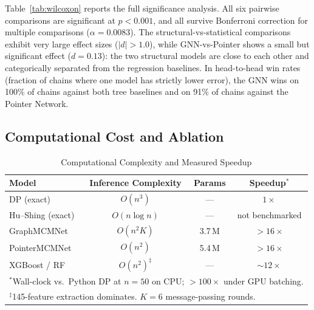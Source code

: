 \documentclass[conference]{IEEEtran}
\begin{document}
Table~\ref{tab:wilcoxon} reports the full significance analysis. All six
pairwise comparisons are significant at $p < 0.001$, and all survive
Bonferroni correction for multiple comparisons
($\alpha = 0.0083$). The structural-vs-statistical comparisons exhibit very
large effect sizes ($|d| > 1.0$), while GNN-vs-Pointer shows a small but
significant effect ($d = 0.13$): the two structural models are close to each
other and categorically separated from the regression baselines. In
head-to-head win rates (fraction of chains where one model has strictly lower
error), the GNN wins on 100\% of chains against both tree baselines and on
91\% of chains against the Pointer Network.

\subsection{Computational Cost and Ablation}
\label{sec:latency}

\begin{table}[t]
\caption{Computational Complexity and Measured Speedup}
\label{tab:complexity}
\centering
\begin{tabular}{lccc}
\toprule
Model & Inference Complexity & Params & Speedup$^{\ast}$ \\
\midrule
DP (exact)      & $O(n^3)$   & ---   & $1\times$ \\
Hu--Shing (exact) & $O(n \log n)$ & --- & not benchmarked \\
GraphMCMNet     & $O(n^2 K)$ & 3.7\,M & ${>}16\times$ \\
PointerMCMNet   & $O(n^2)$   & 5.4\,M & ${>}16\times$ \\
XGBoost / RF    & $O(n^2)^{\ddagger}$ & --- & ${\sim}12\times$ \\
\bottomrule
\multicolumn{4}{l}{\footnotesize $^{\ast}$Wall-clock vs.\ Python DP at $n{=}50$ on CPU; ${>}100\times$ under GPU batching.} \\
\multicolumn{4}{l}{\footnotesize $^{\ddagger}$145-feature extraction dominates. $K{=}6$ message-passing rounds.}
\end{tabular}
\end{table}
\end{document}

